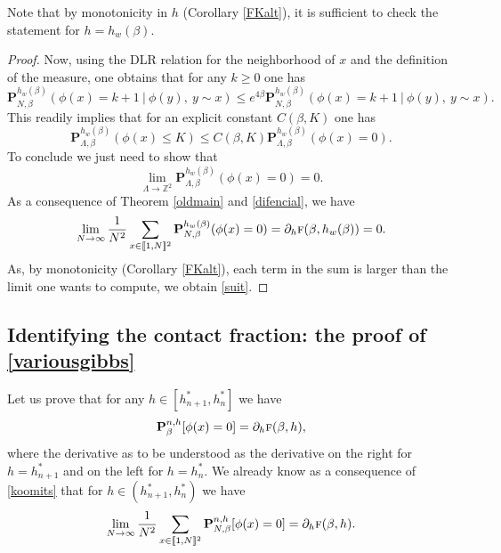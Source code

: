 \documentclass[10pt]{amsart}
\numberwithin{equation}{section}
\theoremstyle{plain}
\theoremstyle{definition}
\newcommand{\lint}{\llbracket}
\newcommand{\rint}{\rrbracket}
\newcommand{\bP}{{\ensuremath{\mathbf P}} }
\newcommand{\bbZ}{{\ensuremath{\mathbb Z}} }
\newcommand{\gb}{\beta}
\newcommand{\gL}{\Lambda}
\newcommand{\tf}{\textsc{f}}
\begin{document}
Note that by monotonicity in $h$ (Corollary \ref{FKalt}), it is sufficient to check the statement for $h=h_w(\gb)$.

\begin{proof}
Now, using the DLR relation for the neighborhood of $x$ and the definition of the measure, one obtains that for any $k\ge 0$ one has
\begin{equation*}
\bP^{h_w(\gb)}_{N,\gb}(\phi(x)=k+1 \ | \ \phi(y),\ y\sim x)\le e^{4\gb} \bP^{h_w(\gb)}_{N,\gb}(\phi(x)=k+1 \ | \ \phi(y),\ y\sim x).
\end{equation*}
This readily implies that for an explicit constant $C(\gb,K)$ one has
\begin{equation*}
\bP^{h_w(\gb)}_{\gL,\gb}(\phi(x)\le K)\le C(\gb,K) \bP^{h_w(\gb)}_{\gL,\gb}(\phi(x)=0).
\end{equation*}
To conclude we just need to show that
\begin{equation}\label{suit}
\lim_{\gL \to \bbZ^2}\bP^{h_w(\gb)}_{\gL,\gb}(\phi(x)=0)=0.
\end{equation}
As a consequence of Theorem \ref{oldmain} and \eqref{difencial},
we have
\begin{equation*}
\lim_{N\to \infty} \frac{1}{N^2}\sum_{x\in \lint 1,N\rint^2} \bP^{h_w(\gb)}_{N,\gb}(\phi(x)=0)=\partial_h \tf(\gb,h_w(\gb))=0.
\end{equation*}
As, by monotonicity (Corollary \ref{FKalt}), each term in the sum is larger than the limit one wants to compute, we obtain \eqref{suit}.
\end{proof}

\subsection{Identifying the contact fraction: the proof of \eqref{variousgibbs}}\label{cf}

Let us prove that for any $h\in [h^*_{n+1},h^*_n]$ we have
\begin{equation}\label{wootz}
\bP^{n,h}_{\gb}[\phi(x)=0]=\partial_h \tf(\gb,h),
\end{equation}
where the derivative as to be understood as the derivative on the right for $h=h^*_{n+1}$ and on the left for
$h=h^*_{n}$.
We already know as a consequence of \eqref{koomits} that for $h\in(h^*_{n+1},h^*_n)$ we have
\begin{equation}\label{zeone}
\lim_{N\to \infty} \frac{1}{N^2}\sum_{x\in \lint 1,N \rint^2 }\bP^{n,h}_{N,\gb}[\phi(x)=0]=\partial_h \tf(\gb,h).
\end{equation}
\end{document}
